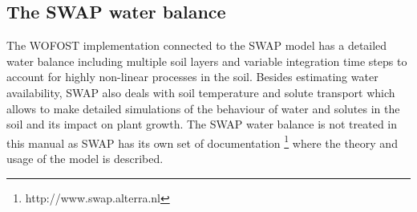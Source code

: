 \subsection{The SWAP water balance}

The WOFOST implementation connected to the SWAP model has a detailed water balance including 
multiple soil layers and variable integration time steps to account for highly non-linear processes 
in the soil. Besides estimating water availability, SWAP also deals with soil temperature and solute 
transport which allows to make 
detailed simulations of the behaviour of water and solutes in the soil and its impact on plant growth.
The SWAP water balance is not treated in this manual as SWAP has its own set of documentation 
\footnote{http://www.swap.alterra.nl} where the theory and usage of the model is described.
